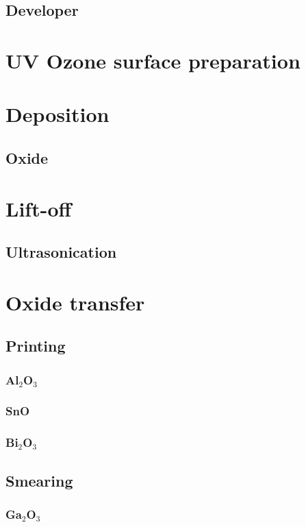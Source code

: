 \documentclass[../Matt_Gebert_Honours_Thesis.tex]{subfiles}
\begin{document}
	\subsection{Developer}\label{sec:developer}
	
	\section{UV Ozone surface preparation}\label{sec:uv_ozone}
	
	\section{Deposition}\label{sec:deposition}
	
	\subsection{Oxide}
	
	\section{Lift-off}\label{}
	\subsection{Ultrasonication}
	
	\section{Oxide transfer}
	\subsection{Printing}
	\subsubsection{Al$_2$O$_3$}
	\subsubsection{SnO}
	\subsubsection{Bi$_2$O$_3$}
	
	\subsection{Smearing}
	\subsubsection{Ga$_2$O$_3$}
	
\end{document}
